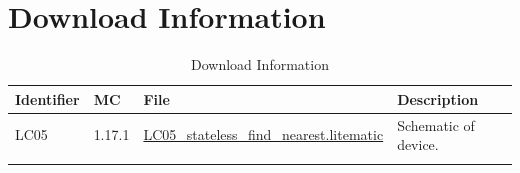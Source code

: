 \documentclass[10pt]{datasheet}
\begin{document}
\section{Download Information}
\begin{table}[h]
    \caption{Download Information}
    \begin{tabularx}{\textwidth}{l | l | l | X}
        \thickhline
        \textbf{Identifier} & \textbf{MC} & \textbf{File} & \textbf{Description} \\
        \hline
        LC05 & 1.17.1 & \href{https://github.com/Soontech-Annals/Archive/blob/364bde8dbcbc2e5337489ff435bcda9b387017e2/Archive/logic-and-computation/LC05\%20Stateless\%20Find\%20Nearest/LC05\_stateless\_find\_nearest.litematic?raw=1}{LC05\_stateless\_find\_nearest.litematic} & Schematic of device. \\
        \hline
        \thickhline
    \end{tabularx}
\end{table}
\end{document}
